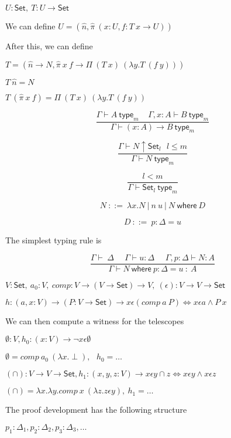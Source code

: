 \documentclass[25pt,dvips,fleqn]{foils}
\newcommand\Set{\mathsf{Set}}
\newcommand\where{\mathsf{where}}
\newcommand\type{\mathsf{type}}
\begin{document}
 $U:\Set,~T:U\rightarrow\Set$

 We can define $U = (\hat{n},\hat{\pi}~(x:U,f:T~x\rightarrow U))$

 After this, we can define

 $T = (\hat{n}\rightarrow N,\hat{\pi}~x~f\rightarrow \Pi~(T~x)~(\lambda y.T~(f~y)))$

 $T~\hat{n} = N$

 $T~(\hat{\pi}~x~f) = \Pi~(T~x)~(\lambda y.T~(f~y))$


$$\frac{\Gamma\vdash A~\type _m~~~~~\Gamma,x:A\vdash B~\type _m}
       {\Gamma\vdash (x:A)\rightarrow B~\type _m}$$

$$\frac{\Gamma\vdash N\uparrow \Set _l~~~l\leq m}
       {\Gamma\vdash N~\type _m}$$

$$\frac{l<m}{\Gamma\vdash \Set _l~\type _m}$$


$$N~::=~\lambda x.N~|~n~u~|~N~\where~D$$

$$D~::=~p:\Delta = u$$

 The simplest typing rule is

 $$\frac{\Gamma\vdash~\Delta~~~~~~\Gamma\vdash u:\Delta~~~~~~\Gamma,p:\Delta\vdash N:A}
        {\Gamma\vdash N~\where~p:\Delta=u~:~A}$$


 $V:\Set,~a_0:V,~comp:V\rightarrow (V\rightarrow\Set)\rightarrow V,
  ~(\epsilon):V\rightarrow V\rightarrow\Set$

 $h:(a,x:V)\rightarrow (P:V\rightarrow\Set)\rightarrow
         x\epsilon (comp~a~P)\Leftrightarrow x\epsilon a\wedge P~x$

 We can then compute a witness for the telescopes

 $\emptyset:V,h_0:(x:V)\rightarrow \neg x\epsilon \emptyset$

 $\emptyset = comp~ a_0~ (\lambda x.\perp),~~~h_0=\dots$

 $(\cap):V\rightarrow V\rightarrow\Set,
  h_1:(x,y,z:V)\rightarrow x\epsilon y\cap z\Leftrightarrow x\epsilon y\wedge x\epsilon z$

 $(\cap) = \lambda x.\lambda y.comp~x~(\lambda z.z\epsilon y),~h_1=\dots$



 The proof development has the following structure

 $p_1:\Delta_1,p_2:\Delta_2,p_3:\Delta_3,\dots$
\end{document}
